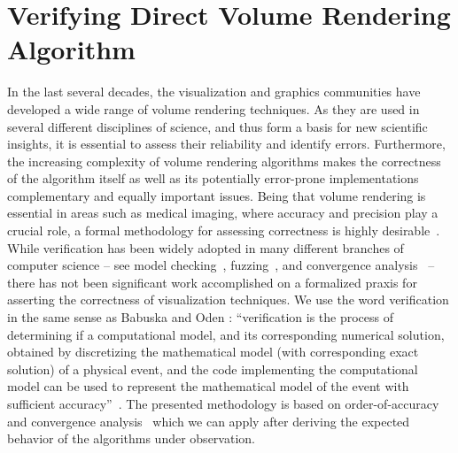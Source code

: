 \chapter{Verifying Direct Volume Rendering Algorithm}
\label{chap:vr}

In the last several decades, the visualization and graphics communities have developed a wide range of volume rendering techniques. As they are used in several different disciplines of science, and thus form a basis for new scientific insights, it is essential to assess their reliability and identify errors. Furthermore, the increasing complexity of volume rendering algorithms makes the correctness of the algorithm itself as well as its potentially error-prone implementations complementary and equally important issues.  Being that volume rendering is essential in areas such as medical imaging, where accuracy and precision play a crucial role, a formal methodology for assessing correctness is highly desirable~\cite{kirby-vv-08, Pommert2002}. While verification has been widely adopted in many different branches of computer science -- see  model checking~\cite{Clarke08}, fuzzing~\cite{godefroid08}, and convergence analysis~\cite{Roy2005} -- there has not been significant work accomplished on a formalized praxis for asserting the correctness of visualization techniques. 
We use the word verification in the same sense as Babuska and Oden \cite{babuska04}: ``verification is the process of determining if a computational model, and its corresponding numerical solution, obtained by discretizing the mathematical model (with corresponding exact solution) of a physical event, and the code implementing the computational model can be used to represent the mathematical model of the event with sufficient accuracy''~\cite{babuska04}. 
The presented methodology is based on order-of-accuracy and convergence analysis~\cite{Roy2005} which we can apply after deriving the expected behavior of the algorithms under observation. 

